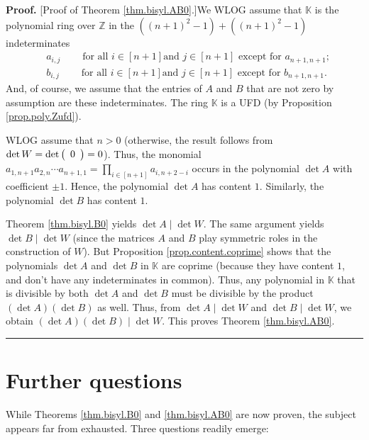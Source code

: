 \documentclass[numbers=enddot,12pt,final,onecolumn,notitlepage]{scrartcl}%
\theoremstyle{definition}
\newenvironment{proof}[1][Proof]{\noindent\textbf{#1.} }{\ \rule{0.5em}{0.5em}}
\let\prodnonlimits\prod
\renewcommand{\prod}{\prodnonlimits\limits}
\begin{document}
\begin{proof}
[Proof of Theorem \ref{thm.bisyl.AB0}.]We WLOG assume that $\mathbb{K}$ is the
polynomial ring over $\mathbb{Z}$ in the $\left(  \left(  n+1\right)
^{2}-1\right)  +\left(  \left(  n+1\right)  ^{2}-1\right)  $ indeterminates%
\begin{align*}
&  a_{i,j}\ \ \ \ \ \ \ \ \ \ \text{for all }i\in\left[  n+1\right]  \text{
and }j\in\left[  n+1\right]  \text{ except for }a_{n+1,n+1};\\
&  b_{i,j}\ \ \ \ \ \ \ \ \ \ \text{for all }i\in\left[  n+1\right]  \text{
and }j\in\left[  n+1\right]  \text{ except for }b_{n+1,n+1}.
\end{align*}
And, of course, we assume that the entries of $A$ and $B$ that are not zero by
assumption are these indeterminates. The ring $\mathbb{K}$ is a UFD (by
Proposition \ref{prop.poly.Zufd}).

WLOG assume that $n>0$ (otherwise, the result follows from $\det W=\det\left(
%
\begin{array}
[c]{c}%
0
\end{array}
\right)  =0$). Thus, the monomial $a_{1,n+1}a_{2,n}\cdots a_{n+1,1}%
=\prod_{i\in\left[  n+1\right]  }a_{i,n+2-i}$ occurs in the polynomial $\det
A$ with coefficient $\pm1$. Hence, the polynomial $\det A$ has content $1$.
Similarly, the polynomial $\det B$ has content $1$.

Theorem \ref{thm.bisyl.B0} yields $\det A\mid\det W$. The same argument yields
$\det B\mid\det W$ (since the matrices $A$ and $B$ play symmetric roles in the
construction of $W$). But Proposition \ref{prop.content.coprime} shows that
the polynomials $\det A$ and $\det B$ in $\mathbb{K}$ are coprime (because
they have content $1$, and don't have any indeterminates in common). Thus, any
polynomial in $\mathbb{K}$ that is divisible by both $\det A$ and $\det B$
must be divisible by the product $\left(  \det A\right)  \left(  \det
B\right)  $ as well. Thus, from $\det A\mid\det W$ and $\det B\mid\det W$, we
obtain $\left(  \det A\right)  \left(  \det B\right)  \mid\det W$. This proves
Theorem \ref{thm.bisyl.AB0}.
\end{proof}

\section{Further questions}

While Theorems \ref{thm.bisyl.B0} and \ref{thm.bisyl.AB0} are now proven, the
subject appears far from exhausted. Three questions readily emerge:
\end{document}

